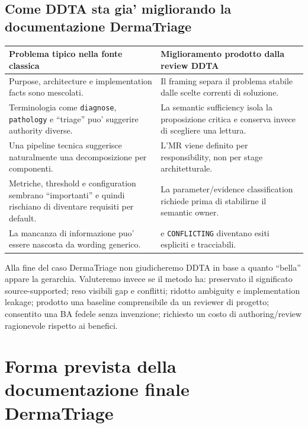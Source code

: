 \documentclass[11pt,a4paper]{article}
\begin{document}
\subsection{Come DDTA sta gia' migliorando la documentazione DermaTriage}

\begin{tabularx}{\textwidth}{L{52mm}Y}
\toprule
\textbf{Problema tipico nella fonte classica} & \textbf{Miglioramento prodotto dalla review DDTA} \\
\midrule
Purpose, architecture e implementation facts sono mescolati. & Il framing separa il problema stabile dalle scelte correnti di soluzione. \\
Terminologia come \texttt{diagnose}, \texttt{pathology} e ``triage'' puo' suggerire authority diverse. & La semantic sufficiency isola la proposizione critica e conserva \NS{} invece di scegliere una lettura. \\
Una pipeline tecnica suggerisce naturalmente una decomposizione per componenti. & L'MR viene definito per responsibility, non per stage architetturale. \\
Metriche, threshold e configuration sembrano ``importanti'' e quindi rischiano di diventare requisiti per default. & La parameter/evidence classification richiede prima di stabilirne il semantic owner. \\
La mancanza di informazione puo' essere nascosta da wording generico. & \NS{} e \texttt{CONFLICTING} diventano esiti espliciti e tracciabili. \\
\bottomrule
\end{tabularx}

\begin{ddtaworking}[title={Criterio per la valutazione finale della metodologia}]
Alla fine del caso DermaTriage non giudicheremo DDTA in base a quanto ``bella'' appare la gerarchia. Valuteremo invece se il metodo ha: preservato il significato source-supported; reso visibili gap e conflitti; ridotto ambiguity e implementation leakage; prodotto una baseline comprensibile da un reviewer di progetto; consentito una BA fedele senza invenzione; richiesto un costo di authoring/review ragionevole rispetto ai benefici.
\end{ddtaworking}

\section{Forma prevista della documentazione finale DermaTriage}
\end{document}
